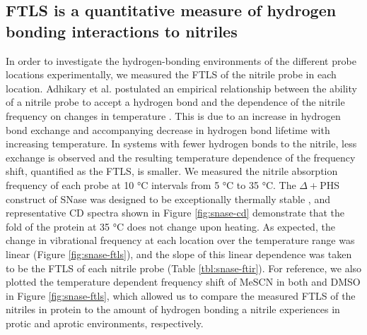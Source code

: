 \subsection{FTLS is a quantitative measure of hydrogen bonding interactions to nitriles}

In order to investigate the hydrogen-bonding environments of the different probe locations experimentally, we measured the FTLS of the nitrile probe in each location. 
Adhikary et al. postulated an empirical relationship between the ability of a nitrile probe to accept a hydrogen bond and the dependence of the nitrile frequency on changes in temperature \cite{Adhikary2015}. 
This is due to an increase in hydrogen bond exchange and accompanying decrease in hydrogen bond lifetime with increasing temperature. 
In systems with fewer hydrogen bonds to the nitrile, less exchange is observed and the resulting temperature dependence of the frequency shift, quantified as the FTLS, is smaller. 
We measured the nitrile absorption frequency of each probe at 10 \si{\celsius} intervals from 5 \si{\celsius} to 35 \si{\celsius}. 
The $\Delta+$PHS construct of SNase was designed to be exceptionally thermally stable \cite{Isom2010, Byrne1995, Garcia-Moreno1997}, and representative CD spectra shown in Figure \ref{fig:snase-cd} demonstrate that the fold of the protein at 35 \si{\celsius} does not change upon heating. 
As expected, the change in vibrational frequency at each location over the temperature range was linear (Figure \ref{fig:snase-ftls}), and the slope of this linear dependence was taken to be the FTLS of each nitrile probe (Table \ref{tbl:snase-ftir}). 
For reference, we also plotted the temperature dependent frequency shift of MeSCN in both  and DMSO in Figure \ref{fig:snase-ftls}, which allowed us to compare the measured FTLS of the nitriles in protein to the amount of hydrogen bonding a nitrile experiences in protic and aprotic environments, respectively.

